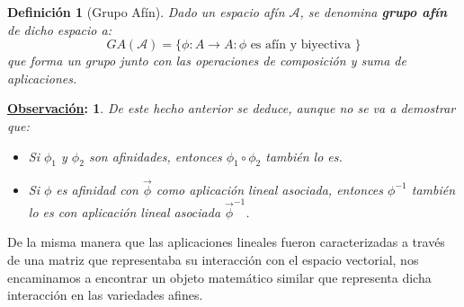 \documentclass[10pt,a4paper,openright]{book}
\theoremstyle{break}
\newtheorem*{defi}{Definición}
\newtheorem*{obs}{\underline{Observación}:}
\begin{document}
\begin{defi}[Grupo Afín]
Dado un espacio afín $\mathcal{A}$, se denomina \textbf{grupo afín} de dicho espacio a:
$$GA(\mathcal{A}) = \{\phi : A \to A : \phi \mbox{ es afín y biyectiva }\}$$
que forma un grupo junto con las operaciones de composición y suma de aplicaciones.
\end{defi}

\begin{obs}
De este hecho anterior se deduce, aunque no se va a demostrar que:
\begin{itemize}
\item Si $\phi_1$ y $\phi_2$ son afinidades, entonces $\phi_1 \circ \phi_2$ también lo es.
\item Si $\phi$ es afinidad con $\vec{\phi}$ como aplicación lineal asociada, entonces $\phi^{-1}$ también lo es con aplicación lineal asociada $\vec{\phi}^{-1}$.
\end{itemize}
\end{obs}

De la misma manera que las aplicaciones lineales fueron caracterizadas a través de una matriz que representaba su interacción con el espacio vectorial, nos encaminamos a encontrar un objeto matemático similar que representa dicha interacción en las variedades afines.
\end{document}
